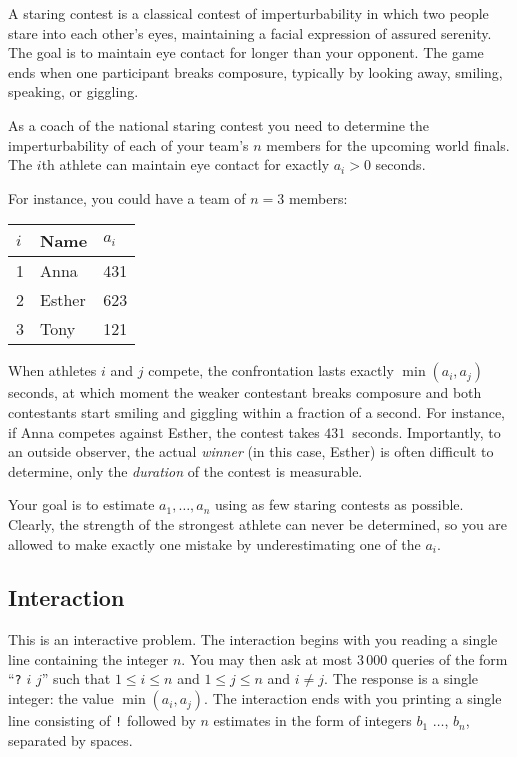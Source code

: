 
A staring contest is a classical contest of imperturbability in which two people stare into each other's eyes, maintaining a facial expression of assured serenity.
The goal is to maintain eye contact for longer than your opponent.
The game ends when one participant breaks composure, typically by looking away, smiling, speaking, or giggling.

As a coach of the national staring contest you need to determine the imperturbability of each of your team's $n$ members for the upcoming world finals.
The $i$th athlete can maintain eye contact for exactly $a_i > 0$ seconds.

For instance, you could have a team of $n=3$ members:

\medskip
\begin{tabular}{lll}
  $i$ & Name & $a_i$\\\hline
  1 & Anna &  431 \\
  2 & Esther & 623 \\
  3 & Tony &  121\\
\end{tabular}

\medskip
When athletes $i$ and $j$ compete, the confrontation lasts exactly $\min(a_i, a_j)$ seconds, at which moment the weaker contestant breaks composure and both contestants start smiling and giggling within a fraction of a second.
For instance, if Anna competes against Esther, the contest takes $431$~seconds.
Importantly, to an outside observer, the actual \emph{winner} (in this case, Esther) is often difficult to determine, only the \emph{duration} of the contest is measurable.

Your goal is to estimate $a_1,\ldots, a_n$ using as few staring contests as possible.
Clearly, the strength of the strongest athlete can never be determined, so you are allowed to make exactly one mistake by underestimating one of the $a_i$.

\subsection*{Interaction}

This is an interactive problem.
The interaction begins with you reading a single line containing the integer $n$.
You may then ask at most $3\,000$ queries of the form ``\texttt{?} $i$ $j$'' such that $1\leq i\leq n$ and $1\leq j\leq n$ and $i\neq j$.
The response is a single integer: the value $\min(a_i, a_j)$.
The interaction ends with you printing a single line consisting of \texttt{!} followed by $n$ estimates in the form of integers $b_1$ $\ldots$, $b_n$, separated by spaces.

